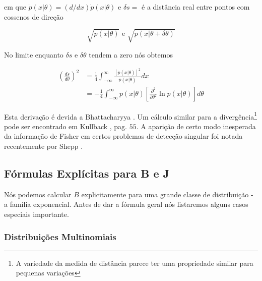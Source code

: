 \documentclass{sbrt2017port}
\begin{document}
em que $\dot{p}(x|\theta) = (d/dx)\dot{p}(x|\theta)$ e $\delta s = $ é a distância real entre pontos com cossenos de direção

\begin{equation}
	\sqrt{p(x|\theta)} \text{ e } \sqrt{p(x|\theta+ \delta\theta)}
	\label{eq56}
\end{equation}

No limite enquanto $\delta s$ e $\delta \theta$ tendem a zero nós obtemos

\begin{equation}\label{eq57}
	\begin{split}
		(\frac{ds}{d\theta})^2 & = \frac{1}{4} \int_{-\infty}^{\infty} \frac{[\dot{p}(x|\theta)]^2}{p(x|\theta)} dx \\
		& = - \frac{1}{4} \int_{-\infty}^{\infty} p(x|\theta) [\frac{\partial^2}{\partial \theta^2} \ln p(x|\theta)] d\theta
	\end{split}
\end{equation}

Esta derivação é devida a Bhattacharyya \cite{r12}. Um cálculo similar para a divergência\footnote[12]{A variedade da medida de distância parece ter uma propriedade similar para pequenas variações} pode ser encontrado em Kullback \cite{r8}, pag. $55$. A aparição de certo modo inesperada da informação de Fisher em certos problemas de detecção singular foi notada recentemente por Shepp \cite{r29}.

\subsection{Fórmulas Explícitas para B e J}

Nós podemos calcular $B$ explicitamente para uma grande classe de distribuição - a família exponencial. Antes de dar a fórmula geral nós listaremos alguns casos especiais importante.

\subsubsection{Distribuições Multinomiais}
\end{document}
